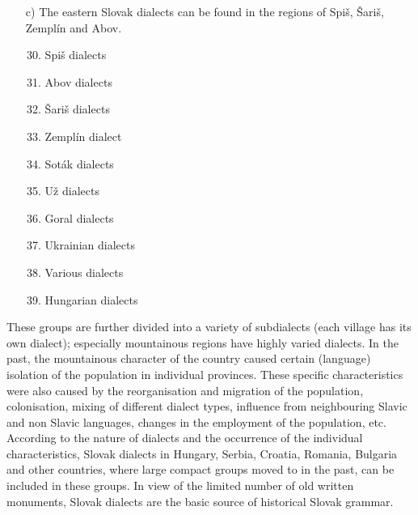 \begin{multicols}{2}
\begin{itemize}
\item[c)] The eastern Slovak dialects can be found in the regions of Spiš, Šariš, Zemplín and Abov.

\begin{enumerate}
\setcounter{enumi}{29}
\item Spiš dialects
\item Abov dialects
\item Šariš dialects
\item Zemplín dialect
\item Soták dialects
\item Už dialects
\setcounter{enumi}{39}
\item Goral dialects
\item Ukrainian dialects
\item Various dialects
\item Hungarian dialects
\end{enumerate}
\end{itemize}

\medskip

These groups are further divided into a variety of subdialects (each village has its own dialect); especially mountainous regions have highly varied dialects. In the past, the mountainous character of the country caused certain (language) isolation of the population in individual provinces. These specific characteristics were also caused by the reorganisation and migration of the population, colonisation, mixing of different dialect types, influence from neighbouring Slavic and non Slavic languages, changes in the employment of the population, etc. According to the nature of dialects and the occurrence of the individual characteristics, Slovak dialects in Hungary, Serbia, Croatia, Romania, Bulgaria and other countries, where large compact groups moved to in the past, can be included in these groups. In view of the limited number of old written monuments, Slovak dialects are the basic source of historical Slovak grammar.


\end{multicols}
